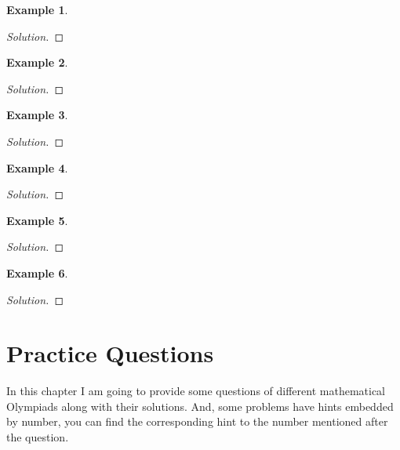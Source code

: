 \documentclass[a4paper,oneside,12 pt]{book}
\theoremstyle{definition}
\newtheorem{exmp}{Example}[section]
\theoremstyle{definition}
\theoremstyle{definition}
\begin{document}
\begin{exmp}
\begin{proof}[Solution]

\end{proof}
\end{exmp}




\begin{exmp}
\begin{proof}[Solution]

\end{proof}
\end{exmp}




\begin{exmp}
\begin{proof}[Solution]

\end{proof}
\end{exmp}




\begin{exmp}
\begin{proof}[Solution]

\end{proof}
\end{exmp}


\begin{exmp}
\begin{proof}[Solution]

\end{proof}
\end{exmp}

\begin{exmp}
\begin{proof}[Solution]

\end{proof}
\end{exmp}



\chapter{Practice Questions}

In this chapter I am going to provide some questions of different mathematical Olympiads along with their solutions. And, some problems have hints embedded by number, you can find the corresponding hint to the number mentioned after the question.
\end{document}
